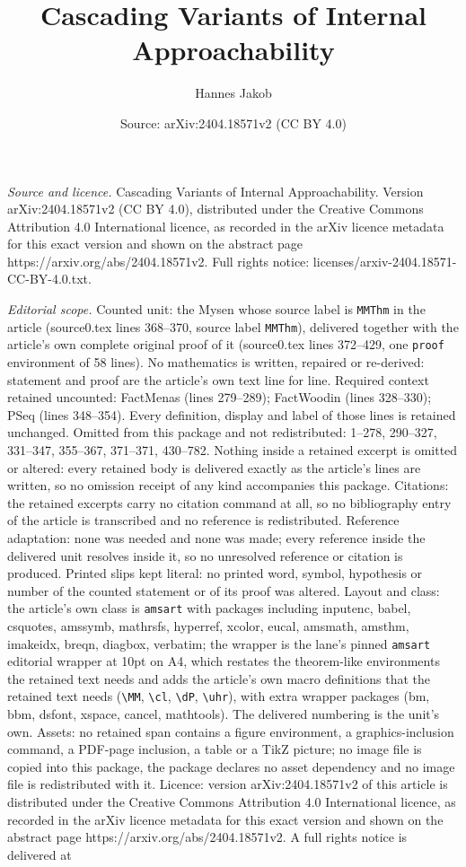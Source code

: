 \documentclass[10pt,a4paper]{amsart}
\title[Cascading Variants of Internal Approachability]{Cascading Variants of Internal Approachability}
\author{Hannes Jakob}
\date{Source: arXiv:2404.18571v2 (CC BY 4.0)}
\begin{document}
\maketitle

\noindent\emph{Source and licence.} Cascading Variants of Internal Approachability. Version arXiv:2404.18571v2 (CC BY 4.0), distributed under the Creative Commons Attribution 4.0 International licence, as recorded in the arXiv licence metadata for this exact version and shown on the abstract page https://arxiv.org/abs/2404.18571v2. Full rights notice: licenses/arxiv-2404.18571-CC-BY-4.0.txt.\par\smallskip

\noindent\textit{Editorial scope.} Counted unit: the Mysen whose source label is \texttt{MMThm} in the article (source0.tex lines 368--370, source label \texttt{MMThm}), delivered together with the article's own complete original proof of it (source0.tex lines 372--429, one \texttt{proof} environment of 58 lines). No mathematics is written, repaired or re-derived: statement and proof are the article's own text line for line. Required context retained uncounted: FactMenas (lines 279--289); FactWoodin (lines 328--330); PSeq (lines 348--354). Every definition, display and label of those lines is retained unchanged. Omitted from this package and not redistributed: 1--278, 290--327, 331--347, 355--367, 371--371, 430--782. Nothing inside a retained excerpt is omitted or altered: every retained body is delivered exactly as the article's lines are written, so no omission receipt of any kind accompanies this package. Citations: the retained excerpts carry no citation command at all, so no bibliography entry of the article is transcribed and no reference is redistributed. Reference adaptation: none was needed and none was made; every reference inside the delivered unit resolves inside it, so no unresolved reference or citation is produced. Printed slips kept literal: no printed word, symbol, hypothesis or number of the counted statement or of its proof was altered. Layout and class: the article's own class is \texttt{amsart} with packages including inputenc, babel, csquotes, amssymb, mathrsfs, hyperref, xcolor, eucal, amsmath, amsthm, imakeidx, breqn, diagbox, verbatim; the wrapper is the lane's pinned \texttt{amsart} editorial wrapper at 10pt on A4, which restates the theorem-like environments the retained text needs and adds the article's own macro definitions that the retained text needs (\texttt{\textbackslash MM}, \texttt{\textbackslash cl}, \texttt{\textbackslash dP}, \texttt{\textbackslash uhr}), with extra wrapper packages (bm, bbm, dsfont, xspace, cancel, mathtools). The delivered numbering is the unit's own. Assets: no retained span contains a figure environment, a graphics-inclusion command, a PDF-page inclusion, a table or a TikZ picture; no image file is copied into this package, the package declares no asset dependency and no image file is redistributed with it. Licence: version arXiv:2404.18571v2 of this article is distributed under the Creative Commons Attribution 4.0 International licence, as recorded in the arXiv licence metadata for this exact version and shown on the abstract page https://arxiv.org/abs/2404.18571v2. A full rights notice is delivered at 
\end{document}
